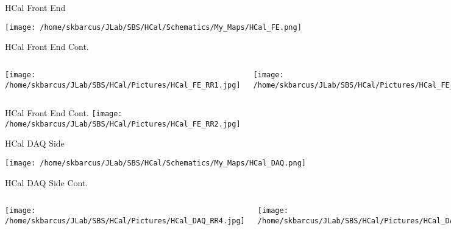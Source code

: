 \documentclass[10pt]{beamer}
\begin{document}
\begin{frame}{HCal Front End}

	\texttt{[image: /home/skbarcus/JLab/SBS/HCal/Schematics/My\_Maps/HCal\_FE.png]}

\end{frame}

\begin{frame}{HCal Front End Cont.}

    \begin{columns}[T,onlytextwidth]
	\texttt{[image: /home/skbarcus/JLab/SBS/HCal/Pictures/HCal\_FE\_RR1.jpg]}
	
	\texttt{[image: /home/skbarcus/JLab/SBS/HCal/Pictures/HCal\_FE\_RR3.jpg]}
	\end{columns}

\end{frame}

\begin{frame}{HCal Front End Cont.}
    \centering
	\texttt{[image: /home/skbarcus/JLab/SBS/HCal/Pictures/HCal\_FE\_RR2.jpg]}

\end{frame}

\begin{frame}{HCal DAQ Side}

	\texttt{[image: /home/skbarcus/JLab/SBS/HCal/Schematics/My\_Maps/HCal\_DAQ.png]}

\end{frame}

\begin{frame}{HCal DAQ Side Cont.}

    \begin{columns}[T,onlytextwidth]
	\texttt{[image: /home/skbarcus/JLab/SBS/HCal/Pictures/HCal\_DAQ\_RR4.jpg]}
	
	\texttt{[image: /home/skbarcus/JLab/SBS/HCal/Pictures/HCal\_DAQ\_RR5.jpg]}
	\end{columns}

\end{frame}
\end{document}

